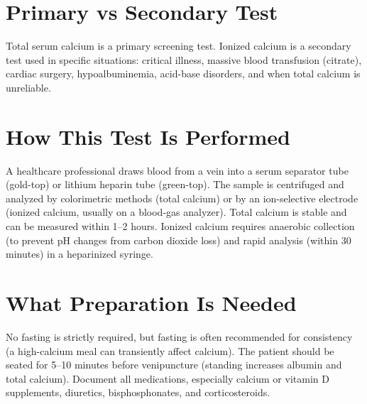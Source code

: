 \section*{Primary vs Secondary Test}
Total serum calcium is a primary screening test. Ionized calcium is a secondary test used in specific situations: critical illness, massive blood transfusion (citrate), cardiac surgery, hypoalbuminemia, acid-base disorders, and when total calcium is unreliable.

\section*{How This Test Is Performed}
A healthcare professional draws blood from a vein into a serum separator tube (gold-top) or lithium heparin tube (green-top). The sample is centrifuged and analyzed by colorimetric methods (total calcium) or by an ion-selective electrode (ionized calcium, usually on a blood-gas analyzer). Total calcium is stable and can be measured within 1--2 hours. Ionized calcium requires anaerobic collection (to prevent pH changes from carbon dioxide loss) and rapid analysis (within 30 minutes) in a heparinized syringe.

\section*{What Preparation Is Needed}
No fasting is strictly required, but fasting is often recommended for consistency (a high-calcium meal can transiently affect calcium). The patient should be seated for 5--10 minutes before venipuncture (standing increases albumin and total calcium). Document all medications, especially calcium or vitamin D supplements, diuretics, bisphosphonates, and corticosteroids.

